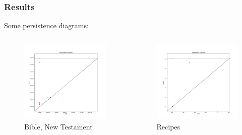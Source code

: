 \documentclass[unknownkeysallowed]{beamer}
\begin{document}
\begin{frame}
\frametitle{Results}
Some persistence diagrams:
\begin{columns}[c]
\begin{figure}
\includegraphics[width=0.9\linewidth]{../plots/diagrams/bible-new-d-all}
\caption{Bible, New Testament}
\end{figure}

\begin{figure}
\includegraphics[width=0.9\linewidth]{../plots/diagrams/recipes-d-all}
\caption{Recipes}
\end{figure}

\end{columns}
\end{frame}
\end{document}
